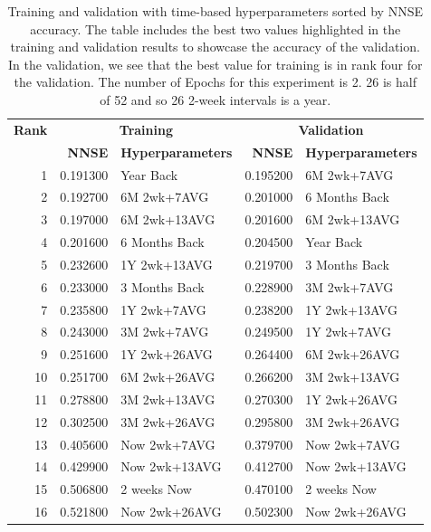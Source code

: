 \documentclass[utf8]{FrontiersinVancouver} %
\begin{document}
\begin{table}[htb]

  \caption{Training and validation with time-based hyperparameters
    sorted by NNSE accuracy. The table includes the best two
    values highlighted in the training and validation results to
    showcase the accuracy of the validation. In the validation,
    we see that the best value for training is in rank four for the
    validation. The number of Epochs for this experiment is 2.
    26 is half of 52 and so 26 2-week intervals is a year.}
  \label{tab:training-2}

  \renewcommand{\arraystretch}{1.2}
\begin{center}
\begin{tabular}{|r|rl||rl|}
  \hline
{\bf Rank} & \multicolumn{2}{c||}{\bfseries Training} & \multicolumn{2}{c|}{\bfseries Validation}  \\
     &   {\bf NNSE} & {\bf Hyperparameters} & {\bf NNSE} & {\bf Hyperparameters} \\
\hline
1 & \color{red} 0.191300 & \color{red} Year Back & \color{blue} 0.195200 & \color{blue} 6M 2wk+7AVG \\
2 & 0.192700 & \color{blue} 6M 2wk+7AVG & \color{teal} 0.201000 & \color{teal} 6 Months Back \\
3 & 0.197000 & 6M 2wk+13AVG & 0.201600 & 6M 2wk+13AVG \\
4 & \color{teal} 0.201600 & \color{teal} 6 Months Back & \color{red} 0.204500 & \color{red} Year Back \\
5 & 0.232600 & 1Y 2wk+13AVG & 0.219700 & 3 Months Back \\
6 & 0.233000 & 3 Months Back & 0.228900 & 3M 2wk+7AVG \\
7 & 0.235800 & 1Y 2wk+7AVG & 0.238200 & 1Y 2wk+13AVG \\
8 & 0.243000 & 3M 2wk+7AVG & 0.249500 & 1Y 2wk+7AVG \\
9 & 0.251600 & 1Y 2wk+26AVG & 0.264400 & 6M 2wk+26AVG \\
10 & 0.251700 & 6M 2wk+26AVG & 0.266200 & 3M 2wk+13AVG \\
11 & 0.278800 & 3M 2wk+13AVG & 0.270300 & 1Y 2wk+26AVG \\
12 & 0.302500 & 3M 2wk+26AVG & 0.295800 & 3M 2wk+26AVG \\
13 & 0.405600 & Now 2wk+7AVG & 0.379700 & Now 2wk+7AVG \\
14 & 0.429900 & Now 2wk+13AVG & 0.412700 & Now 2wk+13AVG \\
15 & 0.506800 & 2 weeks Now & 0.470100 & 2 weeks Now \\
16 & 0.521800 & Now 2wk+26AVG & 0.502300 & Now 2wk+26AVG \\
\hline
\end{tabular}
\end{center}

\end{table}
\end{document}
